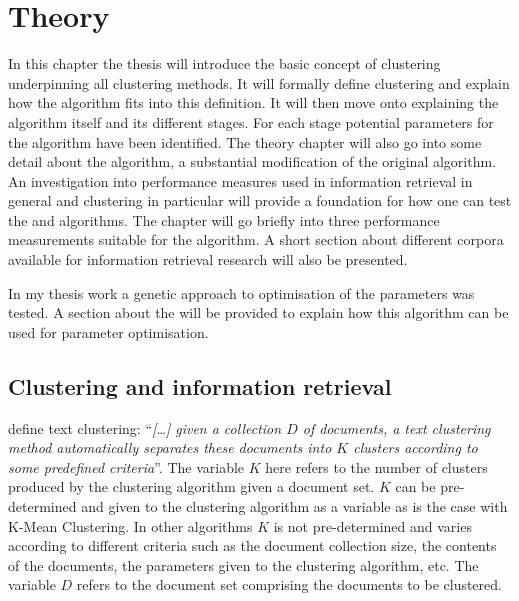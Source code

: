 
\chapter{Theory} %
\label{Theory} %

In this chapter the thesis will introduce the basic concept of clustering underpinning all clustering methods. It will formally define clustering and explain how the \STC algorithm fits into this definition. It will then move onto explaining the \STC algorithm itself and its different stages. For each stage potential parameters for the algorithm have been identified. The theory chapter will also go into some detail about the \CTC algorithm, a substantial modification of the original \STC algorithm. An investigation into performance measures used in information retrieval in general and clustering in particular will provide a foundation for how one can test the \STC and \CTC algorithms. The chapter will go briefly into three performance measurements suitable for the \CTC algorithm. A short section about different corpora available for information retrieval research will also be presented.

In my thesis work a genetic approach to optimisation of the parameters was tested. A section about the \GA will be provided to explain how this algorithm can be used for parameter optimisation.

\section{Clustering and information retrieval}
\label{Clustering}
\citeauthor[][286]{Baeza-Yates2011a} define text clustering: ``\textit{[\dots] given a collection \(D\) of documents, a text clustering method automatically separates these documents into \(K\) clusters according to some predefined criteria}''. The variable \(K\) here refers to the number of clusters produced by the clustering algorithm given a document set. \(K\) can be pre-determined and given to the clustering algorithm as a variable as is the case with K-Mean Clustering. In other algorithms \(K\) is not pre-determined and varies according to different criteria such as the document collection size, the contents of the documents, the parameters given to the clustering algorithm, etc. The variable \(D\) refers to the document set comprising the documents to be clustered.

